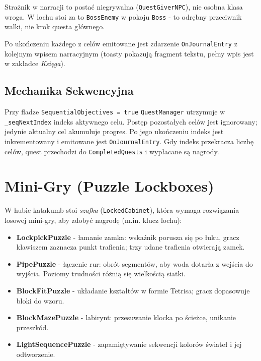 Strażnik w narracji to postać niegrywalna (\texttt{QuestGiverNPC}), nie osobna klasa wroga. W lochu stoi za to \texttt{BossEnemy} w pokoju \texttt{Boss} - to odrębny przeciwnik walki, nie krok questa głównego.

Po ukończeniu każdego z celów emitowane jest zdarzenie \texttt{On\allowbreak Journal\allowbreak Entry} z kolejnym wpisem narracyjnym (toasty pokazują fragment tekstu, pełny wpis jest w zakładce \emph{Księga}).

\subsection{Mechanika Sekwencyjna}

Przy fladze \texttt{SequentialObjectives = true} \texttt{QuestManager} utrzymuje w \texttt{\_seqNextIndex} indeks aktywnego celu. Postęp pozostałych celów jest ignorowany; jedynie aktualny cel akumuluje progres. Po jego ukończeniu indeks jest inkrementowany i emitowane jest \texttt{On\allowbreak Journal\allowbreak Entry}. Gdy indeks przekracza liczbę celów, quest przechodzi do \texttt{CompletedQuests} i wypłacane są nagrody.

\section{Mini-Gry (Puzzle Lockboxes)}

W hubie katakumb stoi \emph{szafka} (\texttt{LockedCabinet}), która wymaga rozwiązania losowej mini-gry, aby zdobyć nagrodę (m.in. klucz lochu):

\begin{itemize}
    \item \textbf{LockpickPuzzle} - łamanie zamka: wskaźnik porusza się po łuku, gracz klawiszem zaznacza punkt trafienia; trzy udane trafienia otwierają zamek.
    \item \textbf{PipePuzzle} - łączenie rur: obrót segmentów, aby woda dotarła z wejścia do wyjścia. Poziomy trudności różnią się wielkością siatki.
    \item \textbf{BlockFitPuzzle} - układanie kształtów w formie Tetrisa; gracz dopasowuje bloki do wzoru.
    \item \textbf{BlockMazePuzzle} - labirynt: przesuwanie klocka po ścieżce, unikanie przeszkód.
    \item \textbf{LightSequencePuzzle} - zapamiętywanie sekwencji kolorów świateł i jej odtworzenie.
\end{itemize}

